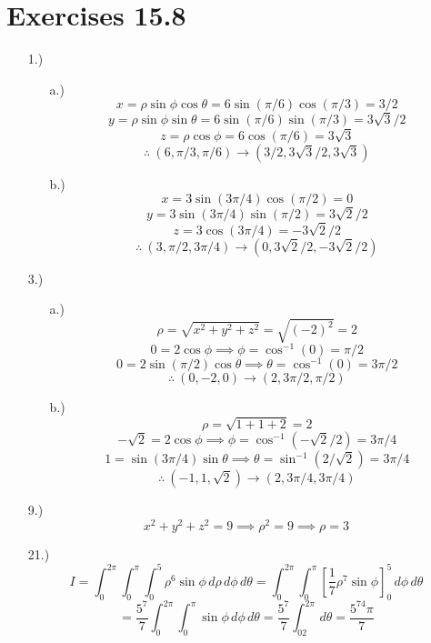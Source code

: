 \documentclass[12pt]{article}
\newcommand{\bracks}[1]{\left[#1\right]}
\newcommand{\parns}[1]{\left(#1\right)}
\begin{document}
\pagestyle{fancy}
\fancyhead{}

\normalsize
\section*{Exercises 15.8}
\begin{itemize}
    \item [1.)] \begin{itemize}
        \item [a.)] \[x=\rho\sin\phi\cos\theta=6\sin\parns{\pi/6}\cos\parns{\pi/3}=3/2\]
        \[y=\rho\sin\phi\sin\theta=6\sin\parns{\pi/6}\sin\parns{\pi/3}=3\sqrt3/2\]
        \[z=\rho\cos\phi=6\cos(\pi/6)=3\sqrt3\]
        \[\therefore\ (6,\pi/3,\pi/6)\to\parns{3/2,3\sqrt3/2,3\sqrt3}\]

        \item [b.)] \[x=3\sin(3\pi/4)\cos(\pi/2)=0\]
        \[y=3\sin(3\pi/4)\sin(\pi/2)=3\sqrt2/2\]
        \[z=3\cos(3\pi/4)=-3\sqrt2/2\]
        \[\therefore\ (3,\pi/2,3\pi/4)\to\parns{0,3\sqrt2/2,-3\sqrt2/2}\]
    \end{itemize}

    \item [3.)] \begin{itemize}
        \item [a.)] \[\rho=\sqrt{x^2+y^2+z^2}=\sqrt{(-2)^2}=2\]
        \[0=2\cos\phi\implies\phi=\cos^{-1}(0)=\pi/2\]
        \[0=2\sin(\pi/2)\cos\theta\implies\theta=\cos^{-1}(0)=3\pi/2\]
        \[\therefore\ (0,-2,0)\to(2,3\pi/2,\pi/2)\]

        \item [b.)] \[\rho=\sqrt{1+1+2}=2\]
        \[-\sqrt2=2\cos\phi\implies\phi=\cos^{-1}\parns{-\sqrt2/2}=3\pi/4\]
        \[1=\sin(3\pi/4)\sin\theta\implies\theta=\sin^{-1}\parns{2/\sqrt2}=3\pi/4\]
        \[\therefore\ \parns{-1,1,\sqrt2}\to\parns{2,3\pi/4,3\pi/4}\]
    \end{itemize}

    \item [9.)] \[x^2+y^2+z^2=9\implies\rho^2=9\implies\rho=3\]

    \item [21.)] \[I=\int^{2\pi}_0\int^{\pi}_0\int^5_0\rho^6\sin\phi\,d\rho\,d\phi\,d\theta=\int^{2\pi}_0\int^\pi_0\bracks{\frac{1}{7}\rho^7\sin\phi}^5_0\,d\phi\,d\theta\]
    \[=\frac{5^7}{7}\int^{2\pi}_0\int^\pi_0\sin\phi\,d\phi\,d\theta=\frac{5^7}{7}\int^{2\pi}_02\,d\theta=\frac{5^74\pi}7\]


\end{itemize}
\end{document}
